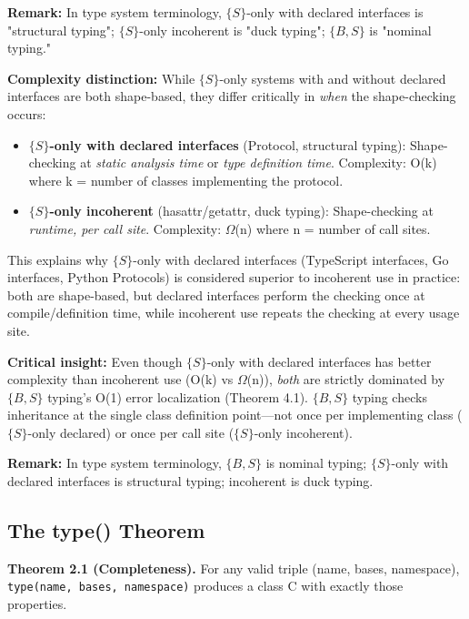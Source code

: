 \textbf{Remark:} In type system terminology, $\{S\}$-only with declared interfaces is "structural typing"; $\{S\}$-only incoherent is "duck typing"; $\{B,S\}$ is "nominal typing."

\textbf{Complexity distinction:} While $\{S\}$-only systems with and without declared interfaces
are both shape-based, they differ critically in \emph{when} the
shape-checking occurs:

\begin{itemize}
\tightlist
\item
  \textbf{$\{S\}$-only with declared interfaces} (Protocol, structural typing): Shape-checking at \emph{static
  analysis time} or \emph{type definition time}. Complexity: O(k) where
  k = number of classes implementing the protocol.
\item
  \textbf{$\{S\}$-only incoherent} (hasattr/getattr, duck typing): Shape-checking at
  \emph{runtime, per call site}. Complexity: \(\Omega\)(n) where n =
  number of call sites.
\end{itemize}

This explains why $\{S\}$-only with declared interfaces (TypeScript interfaces, Go
interfaces, Python Protocols) is considered superior to incoherent use in
practice: both are shape-based, but declared interfaces perform the
checking once at compile/definition time, while incoherent use repeats the
checking at every usage site.

\textbf{Critical insight:} Even though $\{S\}$-only with declared interfaces has better
complexity than incoherent use (O(k) vs \(\Omega\)(n)), \emph{both} are
strictly dominated by $\{B,S\}$ typing's O(1) error localization (Theorem
4.1). $\{B,S\}$ typing checks inheritance at the single class definition
point---not once per implementing class ($\{S\}$-only declared) or once per call
site ($\{S\}$-only incoherent).

\textbf{Remark:} In type system terminology, $\{B,S\}$ is nominal typing; $\{S\}$-only with declared interfaces is structural typing; incoherent is duck typing.

\subsection{The type() Theorem}\label{the-type-theorem}

\textbf{Theorem 2.1 (Completeness).} For any valid triple (name, bases,
namespace), \texttt{type(name,\ bases,\ namespace)} produces a class C
with exactly those properties.

